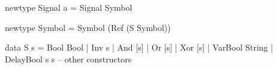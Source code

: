 \begin{haskellcode}
    newtype Signal a = Signal Symbol

    newtype Symbol = Symbol (Ref (S Symbol))

    data S s
        = Bool      Bool
        | Inv       s
        | And       [s]
        | Or        [s]
        | Xor       [s]
        | VarBool   String
        | DelayBool s s
        -- other constructors
\end{haskellcode}
